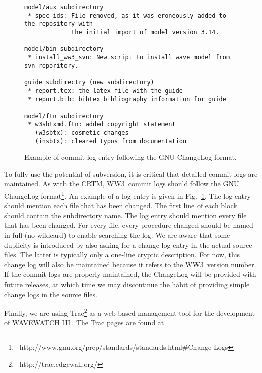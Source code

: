 \documentclass[12pt]{article}
\newcommand{\ww}{WAVEWATCH III$\:$\texttrademark}
\newcommand{\ws}{WW3}
\newcounter{myfigno}[section]
\newenvironment{myfig}[1]{\begin{figure}[#1]
                         \refstepcounter{myfigno}}                       
                        {\end{figure}}
\newcommand{\myfcap}[1]{\begin{list}{\ff Fig. \themyfigno\ :~\hfill}
                       {\rightmargin 8mm \labelsep 0mm
                        \labelwidth 8mm \leftmargin 8mm
                        \topsep 0mm \parskip 0mm \partopsep 0mm }
                        \item \ff #1 \end{list}}
\renewcommand{\themyfigno}{\thesection.\arabic{myfigno}}
\begin{document}
\begin{myfig}{tbp}
\begin{center}
\begin{minipage}[c]{4.5in}
{\scriptsize \begin{verbatim}
model/aux subdirectory
 * spec_ids: File removed, as it was eroneously added to the repository with
             the initial import of model version 3.14.

model/bin subdirectory
 * install_ww3_svn: New script to install wave model from svn reporitory.

guide subdirectry (new subdirectory)
 * report.tex: the latex file with the guide
 * report.bib: bibtex bibliography information for guide

model/ftn subdirectory
 * w3sbtxmd.ftn: added copyright statement
   (w3sbtx): cosmetic changes
   (insbtx): cleared typos from documentation
\end{verbatim}}
\end{minipage}
\end{center}

\myfcap{Example of commit log entry following the GNU ChangeLog format.}
\label{fig:log}
\end{myfig}


To fully use the potential of subversion, it is critical that detailed commit
logs are maintained. As with the CRTM, \ws\ commit logs should follow the GNU
ChangeLog format\footnote{
~http://www.gnu.org/prep/standards/standards.html\#Change-Logs}. An example of
a log entry is given in Fig.~\ref{fig:log}. The log entry should mention each
file that has been changed. The first line of each block should contain the
subdirectory name. The log entry should mention every file that has been
changed. For every file, every procedure changed should be named in full (no
wildcard) to enable searching the log. We are aware that some duplicity is
introduced by also asking for a change log entry in the actual source
files. The latter is typically only a one-line cryptic description. For now,
this change log will also be maintained because it refers to the \ws\ version
number. If the commit logs are properly maintained, the ChangeLog will be
provided with future releases, at which time we may discontinue the habit of
providing simple change logs in the source files.

\vspace{\baselineskip}
\noindent
Finally, we are using Trac\footnote{~http://trac.edgewall.org/} as a web-based
management tool for the development of \ww. The Trac pages are found at
\end{document}
